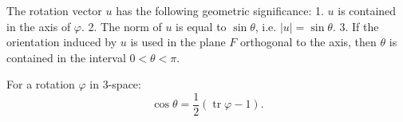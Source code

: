 The rotation vector $u$ has the following geometric significance:
1. $u$ is contained in the axis of $\varphi$.
2. The norm of $u$ is equal to $\sin \theta$, i.e. $|u| = \sin \theta$.
3. If the orientation induced by $u$ is used in the plane $F$ orthogonal to the axis, then $\theta$ is contained in the interval $0 < \theta < \pi$.

For a rotation $\varphi$ in 3-space:
$$\cos \theta = \frac{1}{2} (\operatorname{tr} \varphi - 1).$$
